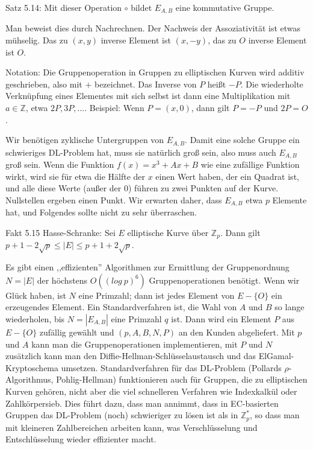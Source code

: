 \documentclass[a4paper]{article}
\begin{document}
\begin{multicols}{3}
{{{{Satz 5.14: Mit dieser Operation $\circ$ bildet $E_{A,B}$ eine kommutative Gruppe.

Man beweist dies durch Nachrechnen. Der Nachweis der Assoziativität ist etwas mühselig. Das zu $(x,y)$ inverse Element ist $(x,-y)$, das zu $O$ inverse Element ist $O$.

Notation: Die Gruppenoperation in Gruppen zu elliptischen Kurven wird additiv geschrieben, also mit $+$ bezeichnet. Das Inverse von $P$ heißt $-P$. Die wiederholte Verknüpfung eines Elementes mit sich selbst ist dann eine Multiplikation mit $a\in\mathbb{Z}$, etwa $2P, 3P,...$. 
Beispiel: Wenn $P=(x,0)$, dann gilt $P=-P$ und $2P=O$.

Wir benötigen zyklische Untergruppen von $E_{A,B}$. Damit eine solche Gruppe ein schwieriges DL-Problem hat, muss sie natürlich groß sein, also muss auch $E_{A,B}$ groß sein. Wenn die Funktion $f(x) =x^3+Ax+B$ wie eine zufällige Funktion wirkt, wird sie für etwa die Hälfte der $x$ einen Wert haben, der ein Quadrat ist, und alle diese Werte (außer der $0$) führen zu zwei Punkten auf der Kurve. Nullstellen ergeben einen Punkt. Wir erwarten daher, dass $E_{A,B}$ etwa $p$ Elemente hat, und Folgendes sollte nicht zu sehr überraschen.

Fakt 5.15 Hasse-Schranke: Sei $E$ elliptische Kurve über $\mathbb{Z}_p$. Dann gilt $p+ 1- 2\sqrt{p}\leq |E|\leq p+1 + 2\sqrt{p}$.

Es gibt einen ,,effizienten'' Algorithmen zur Ermittlung der Gruppenordnung $N=|E|$ der höchstens $O((log\ p)^6)$ Gruppenoperationen benötigt. Wenn wir Glück haben, ist $N$ eine Primzahl; dann ist jedes Element von $E-\{O\}$ ein erzeugendes Element. Ein Standardverfahren ist, die Wahl von $A$ und $B$ so lange wiederholen, bis $N=|E_{A,B}|$ eine Primzahl $q$ ist. Dann wird ein Element $P$ aus $E-\{O\}$ zufällig gewählt und $(p,A,B,N,P)$ an den Kunden abgeliefert. Mit $p$ und $A$ kann man die Gruppenoperationen implementieren, mit $P$ und $N$ zusätzlich kann man den Diffie-Hellman-Schlüsselaustausch und das ElGamal-Kryptoschema umsetzen.
Standardverfahren für das DL-Problem (Pollards $ρ$-Algorithmus, Pohlig-Hellman) funktionieren auch für Gruppen, die zu elliptischen Kurven gehören, nicht aber die viel schnelleren Verfahren wie Indexkalkül oder Zahlkörpersieb. Dies führt dazu, dass man annimmt, dass in EC-basierten Gruppen das DL-Problem (noch) schwieriger zu lösen ist als in $\mathbb{Z}^*_p$, so dass man mit kleineren Zahlbereichen arbeiten kann, was Verschlüsselung und Entschlüsselung wieder effizienter macht.

}}}}
\end{multicols}
\end{document}

